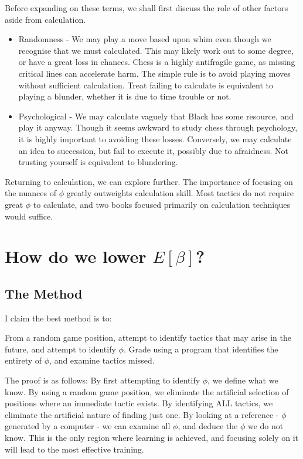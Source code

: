 \documentclass{article}
\begin{document}
Before expanding on these terms, we shall first discuss the role of other factors aside from calculation.
\begin{itemize}
  \item Randomness - We may play a move based upon whim even though we recognise that we must calculated. This may likely work out to some degree, or have a great loss in chances. Chess is a highly antifragile game, as missing critical lines can accelerate harm. The simple rule is to avoid playing moves without sufficient calculation. Treat failing to calculate is equivalent to playing a blunder, whether it is due to time trouble or not.
  \item Psychological - We may calculate vaguely that Black has some resource, and play it anyway. Though it seems awkward to study chess through psychology, it is highly important to avoiding these losses. Conversely, we may calculate an idea to succession, but fail to execute it, possibly due to afraidness. Not trusting yourself is equivalent to blundering. 
\end{itemize} 
Returning to calculation, we can explore further. The importance of focusing on the nuances of $\phi$ greatly outweights calculation skill. Most tactics do not require great $\phi$ to calculate, and two books focused primarily on calculation techniques would suffice.

\section{How do we lower $E[\beta]$?}
\subsection{The Method}
I claim the best method is to: \\
\begin{mdframed}
From a random game position, attempt to identify tactics that may arise in the future, and attempt to identify $\phi$. Grade using a program that identifies the entirety of $\phi$, and examine tactics missed.
\end{mdframed}

The proof is as follows:
By first attempting to identify $\phi$, we define what we know. By using a random game position, we eliminate the artificial selection of positions where an immediate tactic exists. By identifying ALL tactics, we eliminate the artificial nature of finding just one. By looking at a reference - $\phi$ generated by a computer - we can examine all $\phi$, and deduce the $\phi$ we do not know. This is the only region where learning is achieved, and focusing solely on it will lead to the most effective training.
\end{document}
